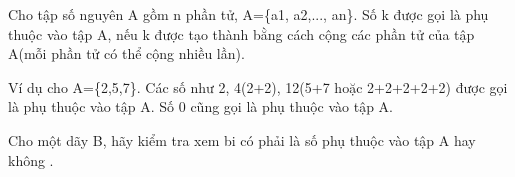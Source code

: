 Cho tập số nguyên A gồm n phần tử, A=\{a1, a2,..., an\}. Số k được gọi là phụ thuộc vào tập A, nếu k được tạo thành bằng cách cộng các phần tử của tập A(mỗi phần tử có thể cộng nhiều lần).  

   Ví dụ  cho A=\{2,5,7\}.  Các số như 2, 4(2+2), 12(5+7 hoặc 2+2+2+2+2) được gọi là phụ thuộc vào tập A. Số 0 cũng gọi là phụ thuộc vào tập A.  

Cho một dãy B, hãy kiểm tra xem bi có phải là số phụ thuộc vào tập A hay không .
